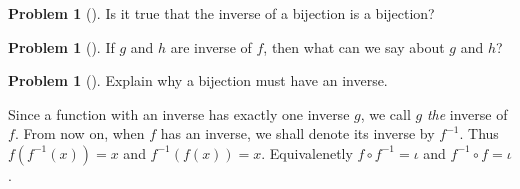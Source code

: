 \documentclass[10pt,]{book}
\theoremstyle{plain}
\theoremstyle{definition}
\newtheorem{activity}[project]{Problem}
\theoremstyle{definition}
\numberwithin{equation}{chapter}
\begin{document}
\begin{activity}[]\marginsymbol[-1em]{} \label{activity-341}
Is it true that the inverse of a bijection is a bijection?%
\end{activity}
\begin{activity}[]\marginsymbol[-1em]{} \label{activity-342}
If \(g\) and \(h\) are inverse of \(f\), then what can we say about \(g\) and \(h\)?%
\end{activity}
\begin{activity}[]\marginsymbol[-1em]{} \label{activity-343}
Explain why a bijection must have an inverse.%
\end{activity}
Since a function with an inverse has exactly one inverse \(g\), we call \(g\) \emph{the} inverse of \(f\).  From now on, when \(f\) has an inverse, we shall denote its inverse by \(f^{-1}\).  Thus \(f(f^{-1}(x)) = x\) and \(f^{-1}(f(x)) = x\).  Equivalenetly \(f\circ f^{-1} = \iota\) and \(f^{-1} \circ f = \iota\).%
\typeout{************************************************}
\typeout{************************************************}
\end{document}
